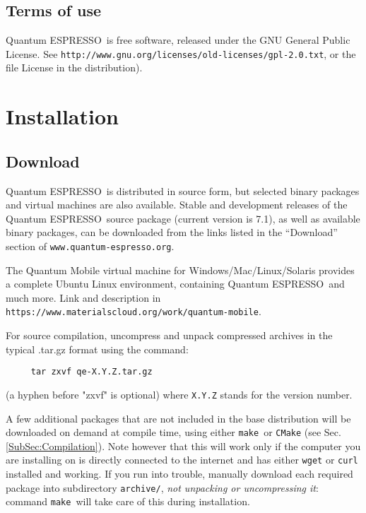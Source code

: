 \documentclass[12pt,a4paper]{article}
\def\version{7.1}
\def\qe{{\sc Quantum ESPRESSO}}
\def\make{\texttt{make}}
\begin{document}
\subsection{Terms of use}
\label{SubSec:Terms}

\qe\ is free software, released under the
GNU General Public License. See
\texttt{http://www.gnu.org/licenses/old-licenses/gpl-2.0.txt},
or the file License in the distribution).


\section{Installation}

\subsection{Download}
\label{SubSec:Download}

\qe\ is distributed in source form, but selected binary packages
and virtual machines are also available.
Stable and development releases of the \qe\ source package
(current version is \version), as well as available binary
packages, can be downloaded from the links listed in the
``Download'' section of \texttt{www.quantum-espresso.org}.

The Quantum Mobile virtual machine for Windows/Mac/Linux/Solaris
provides a complete Ubuntu Linux environment, containing \qe\ and
much more. Link and description in
\texttt{https://www.materialscloud.org/work/quantum-mobile}.

For source compilation, uncompress and unpack compressed archives
in the typical .tar.gz format using the command:
\begin{verbatim}
     tar zxvf qe-X.Y.Z.tar.gz
\end{verbatim}
(a hyphen before "zxvf" is optional) where \texttt{X.Y.Z} stands for the
version number.

A few additional packages that are not included in the base distribution
will be downloaded on demand at compile time, using either \make\ or
\texttt{CMake} (see Sec.\ref{SubSec:Compilation}).
Note however that this will work only if the computer you are
installing on is directly connected to the internet and has
either \texttt{wget} or \texttt{curl} installed and working.
If you run into trouble, manually download each required package
into subdirectory \texttt{archive/}, {\em not unpacking or
uncompressing it}:
command \make\ will take care of this during installation.
\end{document}
